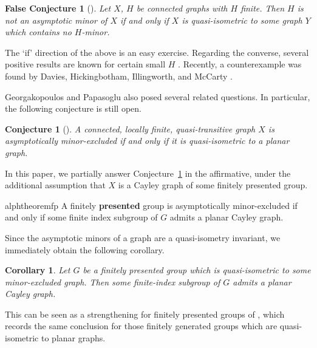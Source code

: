 \documentclass[10pt,a4paper]{amsart}
\newtheorem{alphcor}[alphtheorem]{Corollary}
\newtheorem*{falseconjecture*}{False Conjecture}
\newtheorem{conjecture}[theorem]{Conjecture}
\theoremstyle{definition}
\begin{document}
\begin{falseconjecture*}[{\cite[1.1]{georgakopoulos2023graph}}]
	Let $X$, $H$ be connected graphs with $H$ finite. Then $H$ is not an asymptotic minor of $X$ if and only if $X$ is quasi-isometric to some graph $Y$ which contains no $H$-minor. 
\end{falseconjecture*}


The `if' direction of the above is an easy exercise. Regarding the converse, 
several positive results are known for certain small $H$ \cite{manning2005geometry, chepoi2012constant, fujiwara2023coarse, georgakopoulos2023graph}. Recently, a counterexample was found by Davies, Hickingbotham, Illingworth, and McCarty \cite{davies2024fat}. 

Georgakopoulos and Papasoglu also posed several related questions. In particular, the following conjecture is still  open. 


\begin{conjecture}[{\cite[9.3]{georgakopoulos2023graph}}]\label{con:main-conjecture}
    A connected, locally finite, quasi-transitive graph $X$ is asymptotically minor-excluded if and only if it is quasi-isometric to a planar graph. 
\end{conjecture}


In this paper, we partially answer Conjecture~\ref{con:main-conjecture} in the affirmative, under the additional assumption that $X$ is a Cayley graph of some finitely presented group. 


\begin{restatable}{alphtheorem}{fp}\label{thm:main-result}
A finitely \textbf{presented} group is asymptotically minor-excluded if and only if some finite index subgroup of $G$ admits a planar Cayley graph. 
\end{restatable}

Since the asymptotic minors of a graph are a quasi-isometry invariant, we immediately obtain the following corollary. 

\begin{alphcor}
    Let $G$ be a finitely presented group which is quasi-isometric to some minor-excluded graph. Then some finite-index subgroup of $G$ admits a planar Cayley graph. 
\end{alphcor}

This can be seen as a strengthening for finitely presented groups of \cite[Cor.~D]{macmanus2023accessibility}, which records the same conclusion for those finitely generated groups which are quasi-isometric to planar graphs. 
\end{document}
